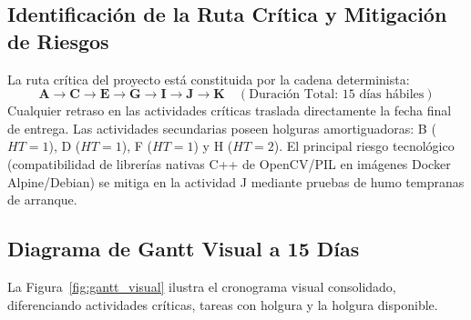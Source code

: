 \documentclass[12pt,letterpaper]{article}
\begin{document}
\subsection{Identificación de la Ruta Crítica y Mitigación de Riesgos}
La ruta crítica del proyecto está constituida por la cadena determinista:
\begin{equation}
\mathbf{A} \rightarrow \mathbf{C} \rightarrow \mathbf{E} \rightarrow \mathbf{G} \rightarrow \mathbf{I} \rightarrow \mathbf{J} \rightarrow \mathbf{K} \quad (\text{Duración Total: } 15 \text{ días hábiles})
\end{equation}
Cualquier retraso en las actividades críticas traslada directamente la fecha final de entrega. Las actividades secundarias poseen holguras amortiguadoras: B ($HT=1$), D ($HT=1$), F ($HT=1$) y H ($HT=2$). El principal riesgo tecnológico (compatibilidad de librerías nativas C++ de OpenCV/PIL en imágenes Docker Alpine/Debian) se mitiga en la actividad J mediante pruebas de humo tempranas de arranque.

\subsection{Diagrama de Gantt Visual a 15 Días}
La Figura~\ref{fig:gantt_visual} ilustra el cronograma visual consolidado, diferenciando actividades críticas, tareas con holgura y la holgura disponible.
\end{document}
